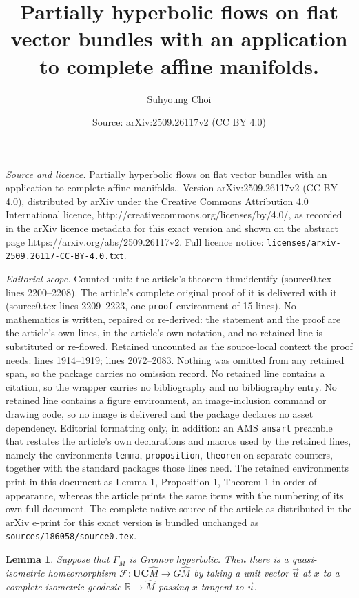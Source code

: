 \documentclass[10pt,a4paper]{amsart}
\title{Partially hyperbolic flows on flat vector bundles with an application to complete affine manifolds.}
\author{Suhyoung Choi}
\date{Source: arXiv:2509.26117v2 (CC BY 4.0)}
\newtheorem{lemma}{Lemma}
\newcommand{\Uc}{\mathbf{UC}}
\newcommand\bR{{\mathbb{R}}}
\newcommand\ra{\rightarrow}
\begin{document}
\maketitle

\noindent\emph{Source and licence.} Partially hyperbolic flows on flat vector bundles with an application to complete affine manifolds.. Version arXiv:2509.26117v2 (CC BY 4.0), distributed by arXiv under the Creative Commons Attribution 4.0 International licence, http://creativecommons.org/licenses/by/4.0/, as recorded in the arXiv licence metadata for this exact version and shown on the abstract page https://arxiv.org/abs/2509.26117v2. Full licence notice: \texttt{licenses/arxiv-2509.26117-CC-BY-4.0.txt}.\par\smallskip

\noindent\textit{Editorial scope.} Counted unit: the article's theorem thm:identify (source0.tex lines 2200--2208). The article's complete original proof of it is delivered with it (source0.tex lines 2209--2223, one \texttt{proof} environment of 15 lines). No mathematics is written, repaired or re-derived: the statement and the proof are the article's own lines, in the article's own notation, and no retained line is substituted or re-flowed.  Retained uncounted as the source-local context the proof needs: lines 1914--1919; lines 2072--2083.  Nothing was omitted from any retained span, so the package carries no omission record.  No retained line contains a citation, so the wrapper carries no bibliography and no bibliography entry.  No retained line contains a figure environment, an image-inclusion command or drawing code, so no image is delivered and the package declares no asset dependency.  Editorial formatting only, in addition: an AMS \texttt{amsart} preamble that restates the article's own declarations and macros used by the retained lines, namely the environments \texttt{lemma}, \texttt{proposition}, \texttt{theorem} on separate counters, together with the standard packages those lines need.  The retained environments print in this document as Lemma 1, Proposition 1, Theorem 1 in order of appearance, whereas the article prints the same items with the numbering of its own full document.  The complete native source of the article as distributed in the arXiv e-print for this exact version is bundled unchanged as \texttt{sources/186058/source0.tex}.
\begin{lemma} \label{lem:identify} 
	Suppose that $\Gamma_M$ is Gromov hyperbolic. 
	Then there is a quasi-isometric homeomorphism $\mathcal{F}:\Uc \hat M \ra G\hat M$
	by taking a unit vector $\vec{u}$ at $x$ to a complete isometric geodesic 
	$\bR \ra \hat M$ passing $x$ tangent to $\vec{u}$. 
	\end{lemma} 
\end{document}
